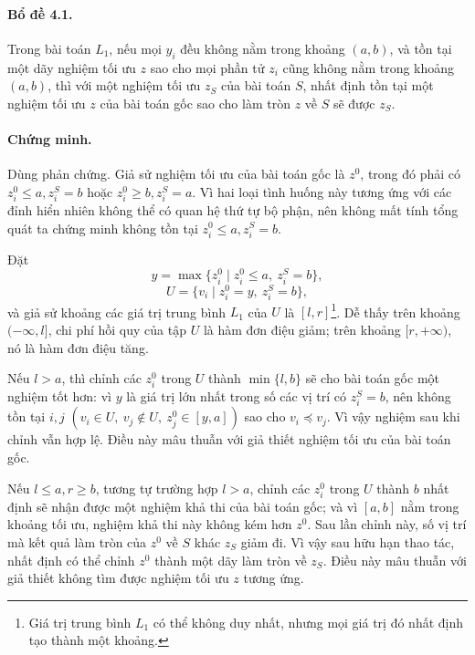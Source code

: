 \documentclass[11pt]{article}
\begin{document}
\paragraph{Bổ đề 4.1.}
Trong bài toán \(L_1\), nếu mọi \(y_i\) đều không nằm trong khoảng \((a,b)\), và
tồn tại một dãy nghiệm tối ưu \(z\) sao cho mọi phần tử \(z_i\) cũng không nằm
trong khoảng \((a,b)\), thì với một nghiệm tối ưu \(z_S\) của bài toán \(S\),
nhất định tồn tại một nghiệm tối ưu \(z\) của bài toán gốc sao cho làm tròn
\(z\) về \(S\) sẽ được \(z_S\).

\paragraph{Chứng minh.}
Dùng phản chứng. Giả sử nghiệm tối ưu của bài toán gốc là \(z^0\), trong đó
phải có \(z_i^0\le a,z_i^S=b\) hoặc \(z_i^0\ge b,z_i^S=a\). Vì hai loại tình
huống này tương ứng với các đỉnh hiển nhiên không thể có quan hệ thứ tự bộ
phận, nên không mất tính tổng quát ta chứng minh không tồn tại
\(z_i^0\le a,z_i^S=b\).

Đặt
\[
  y=\max\{z_i^0\mid z_i^0\le a,\ z_i^S=b\},
\]
\[
  U=\{v_i\mid z_i^0=y,\ z_i^S=b\},
\]
và giả sử khoảng các giá trị trung bình \(L_1\) của \(U\) là
\([l,r]\)\footnote{Giá trị trung bình \(L_1\) có thể không duy nhất, nhưng mọi
giá trị đó nhất định tạo thành một khoảng.}. Dễ thấy trên khoảng \((-\infty,l]\),
chi phí hồi quy của tập \(U\) là hàm đơn điệu giảm; trên khoảng \([r,+\infty)\),
nó là hàm đơn điệu tăng.

Nếu \(l>a\), thì chỉnh các \(z_i^0\) trong \(U\) thành \(\min\{l,b\}\) sẽ cho
bài toán gốc một nghiệm tốt hơn: vì \(y\) là giá trị lớn nhất trong số các vị
trí có \(z_i^S=b\), nên không tồn tại \(i,j\)
\((v_i\in U,\ v_j\notin U,\ z_j^0\in[y,a])\) sao cho
\(v_i\preceq v_j\). Vì vậy nghiệm sau khi chỉnh vẫn hợp lệ. Điều này mâu thuẫn
với giả thiết nghiệm tối ưu của bài toán gốc.

Nếu \(l\le a,r\ge b\), tương tự trường hợp \(l>a\), chỉnh các \(z_i^0\) trong
\(U\) thành \(b\) nhất định sẽ nhận được một nghiệm khả thi của bài toán gốc; và
vì \([a,b]\) nằm trong khoảng tối ưu, nghiệm khả thi này không kém hơn \(z^0\).
Sau lần chỉnh này, số vị trí mà kết quả làm tròn của \(z^0\) về \(S\) khác
\(z_S\) giảm đi. Vì vậy sau hữu hạn thao tác, nhất định có thể chỉnh \(z^0\)
thành một dãy làm tròn về \(z_S\). Điều này mâu thuẫn với giả thiết không tìm
được nghiệm tối ưu \(z\) tương ứng.
\end{document}
